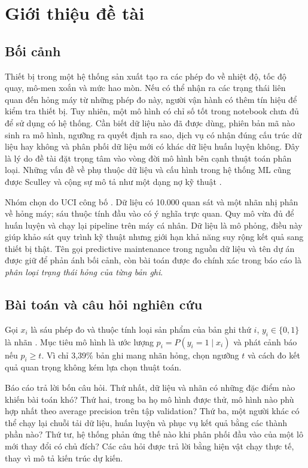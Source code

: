 \chapter{Giới thiệu đề tài}
\section{Bối cảnh}
Thiết bị trong một hệ thống sản xuất tạo ra các phép đo về nhiệt độ, tốc độ quay, mô-men xoắn và mức hao mòn. Nếu có thể nhận ra các trạng thái liên quan đến hỏng máy từ những phép đo này, người vận hành có thêm tín hiệu để kiểm tra thiết bị. Tuy nhiên, một mô hình có chỉ số tốt trong notebook chưa đủ để sử dụng có hệ thống. Cần biết dữ liệu nào đã được dùng, phiên bản mã nào sinh ra mô hình, ngưỡng ra quyết định ra sao, dịch vụ có nhận đúng cấu trúc dữ liệu hay không và phân phối dữ liệu mới có khác dữ liệu huấn luyện không. Đây là lý do đề tài đặt trọng tâm vào vòng đời mô hình bên cạnh thuật toán phân loại. Những vấn đề về phụ thuộc dữ liệu và cấu hình trong hệ thống ML cũng được Sculley và cộng sự mô tả như một dạng nợ kỹ thuật \cite{sculley2015}.

Nhóm chọn \dataset{} do UCI công bố \cite{uci2020}. Dữ liệu có 10.000 quan sát và một nhãn nhị phân về hỏng máy; sáu thuộc tính đầu vào có ý nghĩa trực quan. Quy mô vừa đủ để huấn luyện và chạy lại pipeline trên máy cá nhân. Dữ liệu là mô phỏng, điều này giúp khảo sát quy trình kỹ thuật nhưng giới hạn khả năng suy rộng kết quả sang thiết bị thật. Tên gọi predictive maintenance trong nguồn dữ liệu và tên dự án được giữ để phản ánh bối cảnh, còn bài toán được đo chính xác trong báo cáo là \emph{phân loại trạng thái hỏng của từng bản ghi}.

\section{Bài toán và câu hỏi nghiên cứu}
Gọi $x_i$ là sáu phép đo và thuộc tính loại sản phẩm của bản ghi thứ $i$, $y_i\in\{0,1\}$ là nhãn . Mục tiêu mô hình là ước lượng $p_i=P(y_i=1\mid x_i)$ và phát cảnh báo nếu $p_i\geq t$. Vì chỉ 3,39\% bản ghi mang nhãn hỏng, chọn ngưỡng $t$ và cách đo kết quả quan trọng không kém lựa chọn thuật toán.

Báo cáo trả lời bốn câu hỏi. Thứ nhất, dữ liệu và nhãn có những đặc điểm nào khiến bài toán khó? Thứ hai, trong ba họ mô hình được thử, mô hình nào phù hợp nhất theo average precision trên tập validation? Thứ ba, một người khác có thể chạy lại chuỗi tải dữ liệu, huấn luyện và phục vụ kết quả bằng các thành phần nào? Thứ tư, hệ thống phản ứng thế nào khi phân phối đầu vào của một lô mới thay đổi có chủ đích? Các câu hỏi được trả lời bằng hiện vật chạy thực tế, thay vì mô tả kiến trúc dự kiến.


